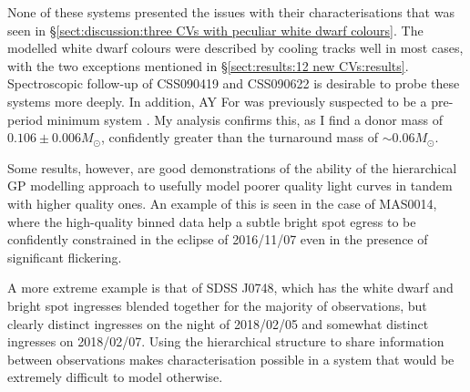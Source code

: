 None of these systems presented the issues with their characterisations that was seen in \S\ref{sect:discussion:three CVs with peculiar white dwarf colours}. The modelled white dwarf colours were described by cooling tracks well in most cases, with the two exceptions mentioned in \S\ref{sect:results:12 new CVs:results}. Spectroscopic follow-up of CSS090419 and CSS090622 is desirable to probe these systems more deeply. In addition, AY For was previously suspected to be a pre-period minimum system \citep{mason2005}. My analysis confirms this, as I find a donor mass of $0.106\pm0.006 M_\odot$, confidently greater than the turnaround mass of $\sim0.06 M_\odot$.

Some results, however, are good demonstrations of the ability of the hierarchical GP modelling approach to usefully model poorer quality light curves in tandem with higher quality ones.
An example of this is seen in the case of MAS0014, where the high-quality binned data help a subtle bright spot egress to be confidently constrained in the eclipse of 2016/11/07 even in the presence of significant flickering.

A more extreme example is that of SDSS J0748, which has the white dwarf and bright spot ingresses blended together for the majority of observations, but clearly distinct ingresses on the night of 2018/02/05 and somewhat distinct ingresses on 2018/02/07.
Using the hierarchical structure to share information between observations makes characterisation possible in a system that would be extremely difficult to model otherwise.

